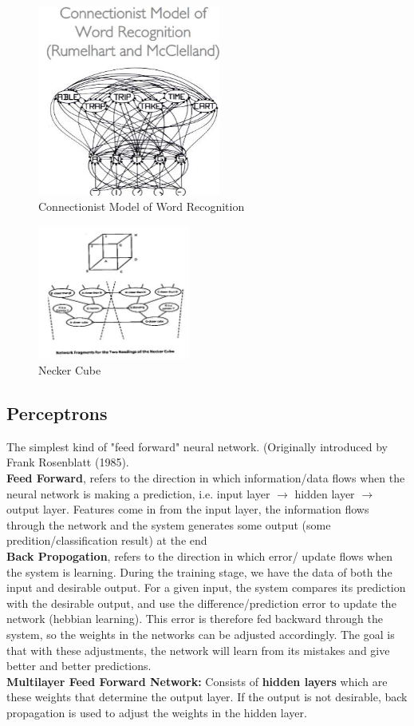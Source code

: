 \documentclass{article}
\begin{document}
\begin{figure}[h]
\centering
\includegraphics[width=6cm]{images/connectionist.JPG}
\caption{Connectionist Model of Word Recognition}
\label{fig: connectionist}
\end{figure}

\begin{figure}[htb]
\centering
\includegraphics[width=5cm]{images/necker.JPG}
\caption{Necker Cube}
\label{fig: Necker}
\end{figure}


\subsection{Perceptrons}
The simplest kind of "feed forward" neural network. (Originally introduced by Frank Rosenblatt (1985).\\
\textbf{Feed Forward}, refers to the direction in which information/data flows when the neural network is making a prediction, i.e. input layer $\rightarrow$ hidden layer $\rightarrow$ output layer. Features come in from the input layer, the information flows through the network and the system generates some output (some predition/classification result) at the end\\
\textbf{Back Propogation}, refers to the direction in which error/ update flows when the system is learning. During the training stage, we have the data of both the input and desirable output. For a given input, the system compares its prediction with the desirable output, and use  the difference/prediction error to update the network (hebbian learning). This error is therefore fed backward through the system, so the weights in the networks can be adjusted accordingly. The goal is that with these adjustments, the network will learn from its mistakes and give better and better predictions. \\
\textbf{Multilayer Feed Forward Network:} Consists of \textbf{hidden layers} which are these weights that determine the output layer. If the output is not desirable, back propagation is used to adjust the weights in the hidden layer. \\
\end{document}

